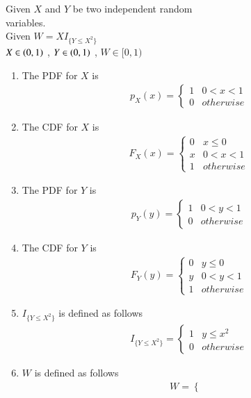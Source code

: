 \documentclass[journal,12pt,twocolumn]{IEEEtran}
\begin{document}
Given $X$ and $Y$ be two independent random\\
variables. \\
Given $W=XI_{\{Y\leq X^2\}}$ \\
$X \in \left(0,1\right)$ , $Y \in \left(0,1\right)$ , $W \in [0,1)$\\
\begin{enumerate}
\item The PDF for $X$ is
\begin{align}
p_X(x) = 
\begin{cases}
     1 & 0 < x  < 1 \\
     0 & otherwise 
\end{cases}\label{1}
\end{align}
\item The CDF for $X$ is
\begin{align}
F_{X}(x)  = 
\begin{cases}
      0 & x \leq 0 \\
      x & 0 < x < 1 \\
      1 & otherwise
\end{cases}  \label{eq:2}
\end{align}
\item The PDF for $Y$ is
\begin{align}
p_{Y}(y)  = 
\begin{cases}
      1 & 0 < y < 1 \\
      0 & otherwise 
\end{cases} \label{3}
\end{align}
\item The CDF for $Y$ is
\begin{align}
F_{Y}(y)  = 
\begin{cases}
      0 & y \leq 0 \\
      y & 0 < y < 1 \\
      1 & otherwise 
\end{cases}\label{4}
\end{align}
\item $I_{\{Y\leq X^2\}}$ is defined as follows
\begin{align} 
I_{\{Y\leq X^2\}} =
\begin{cases}
    1 & y \leq x^2  \\
    0 & otherwise 
\end{cases} \label{5}
\end{align}
\item $W$ is defined as follows
\begin{align}
W  = 
\begin{cases}

\end{cases}
\end{align}
\end{enumerate}
\end{document}
